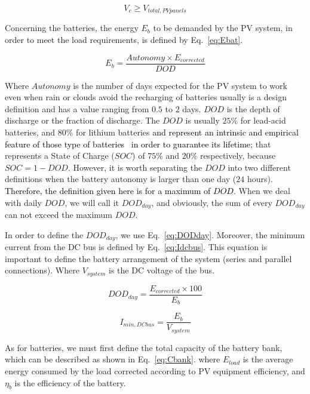 \documentclass[10pt,journal,compsoc]{IEEEtran}
\begin{document}
\begin{equation}
\label{eq:Vcmin}
V_{c} \geq V_{total,PVpanels}
\end{equation}

Concerning the batteries, the energy $E_{b}$ to be demanded by the PV system, in order to meet the load requirements, is defined by Eq.~\eqref{eq:Ebat}.

\begin{equation}
\label{eq:Ebat}
E_{b} = \dfrac{Autonomy \times E_{corrected}}{DOD}
\end{equation}

\noindent Where $Autonomy$ is the number of days expected for the PV system to work even when rain or clouds avoid the recharging of batteries usually is a design definition and has a value ranging from $0.5$ to $2$ days. $DOD$ is the depth of discharge or the fraction of discharge. The $DOD$ is usually $25$\% for lead-acid batteries, and $80$\% for lithium batteries \textcolor{black}{and represent an intrinsic and empirical feature of those type of batteries~\cite{Pinho} in order to guarantee its lifetime}; that represents a State of Charge ($SOC$) of $75$\% and $20$\% respectively, because $SOC=1-DOD$. However, it is worth separating the $DOD$ into two different definitions when the battery autonomy is larger than one day ($24$ hours). \textcolor{black}{Therefore, the definition given here is for a maximum of $DOD$}. When we deal with daily $DOD$, we will call it $DOD_{day}$, and obviously, the sum of every $DOD_{day}$ can not exceed the maximum $DOD$.

In order to define the $DOD_{day}$, we use Eq.~\eqref{eq:DODday}. Moreover, the minimum current from the DC bus is defined by Eq.~\eqref{eq:Idcbus}. This equation is important to define the battery arrangement of the system (series and parallel connections). Where $V_{system}$ is the DC voltage of the bus.


\begin{equation}
\label{eq:DODday}
DOD_{day} = \dfrac{E_{corrected} \times 100}{E_{b}}
\end{equation}

\begin{equation}
\label{eq:Idcbus}
I_{min,DCbus} = \dfrac{E_{b}}{V_{system}}
\end{equation}

As for batteries, we must first define the total capacity of the battery bank, which can be described as shown in Eq.~\ref{eq:Cbank}. where $ E_{load} $ is the average energy consumed by the load corrected according to PV equipment efficiency, and $ \eta_{b} $ is the efficiency of the battery.
\end{document}
